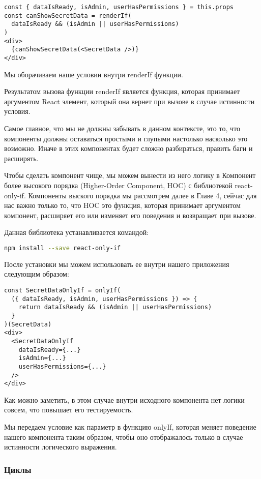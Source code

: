 \begin{lstlisting}
const { dataIsReady, isAdmin, userHasPermissions } = this.props
const canShowSecretData = renderIf(
  dataIsReady && (isAdmin || userHasPermissions)
)
<div>
  {canShowSecretData(<SecretData />)}
</div>
\end{lstlisting}


Мы оборачиваем наше условии внутри renderIf функции.

Результатом вызова функции renderIf является функция, которая принимает аргументом React элемент, который она вернет при вызове в случае истинности условия.

Самое главное, что мы не должны забывать в данном контексте, это то, что компоненты должны оставаться простыми и глупыми настолько насколько это возможно. Иначе в этих компонентах будет сложно разбираться, править баги и расширять.

Чтобы сделать компонент чище, мы можем вынести из него логику в Компонент более высокого порядка (Higher-Order Component, HOC) с библиотекой react-only-if. Компоненты выского порядка мы рассмотрем далее в Главе 4, сейчас для нас важно только то, что HOC это функция, которая принимает аргументом компонент, расширяет его или изменяет его поведения и возвращает при вызове.

Данная библиотека устанавливается командой:

\begin{lstlisting}[language=bash]
npm install --save react-only-if
\end{lstlisting}

После установки мы можем использовать ее внутри нашего приложения следующим образом:

\begin{lstlisting}
const SecretDataOnlyIf = onlyIf(
  ({ dataIsReady, isAdmin, userHasPermissions }) => {
    return dataIsReady && (isAdmin || userHasPermissions)
  }
)(SecretData)
<div>
  <SecretDataOnlyIf
    dataIsReady={...}
    isAdmin={...}
    userHasPermissions={...}
  /> 
</div>
\end{lstlisting}

Как можно заметить, в этом случае внутри исходного компонента нет логики совсем, что повышает его тестируемость.

Мы передаем условие как параметр в функцию onlyIf, которая меняет поведение нашего компонента таким образом, чтобы оно отображалось только в случае истинности логического выражения.

\subsubsection{Циклы}

